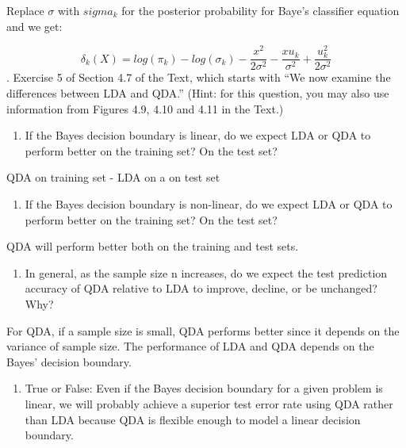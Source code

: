 \documentclass[
  11pt,
]{article}
\providecommand{\tightlist}{%
  \setlength{\itemsep}{0pt}\setlength{\parskip}{0pt}}
\begin{document}
Replace \(\sigma\) with \(sigma_k\) for the posterior probability for
Baye's classifier equation and we get:

\[\delta_k(X) = log(\pi_k) - log(\sigma_k) - \frac{x^2}{2\sigma^2} - \frac{xu_k}{\sigma^2} + \frac{u^2_k}{2\sigma^2} \]
. Exercise 5 of Section 4.7 of the Text, which starts with ``We now
examine the differences between LDA and QDA.'' (Hint: for this question,
you may also use information from Figures 4.9, 4.10 and 4.11 in the
Text.)

\begin{enumerate}
\def\labelenumi{(\alph{enumi})}
\tightlist
\item
  If the Bayes decision boundary is linear, do we expect LDA or QDA to
  perform better on the training set? On the test set?
\end{enumerate}

QDA on training set - LDA on a on test set

\begin{enumerate}
\def\labelenumi{(\alph{enumi})}
\setcounter{enumi}{1}
\tightlist
\item
  If the Bayes decision boundary is non-linear, do we expect LDA or QDA
  to perform better on the training set? On the test set?
\end{enumerate}

QDA will perform better both on the training and test sets.

\begin{enumerate}
\def\labelenumi{(\alph{enumi})}
\setcounter{enumi}{2}
\tightlist
\item
  In general, as the sample size n increases, do we expect the test
  prediction accuracy of QDA relative to LDA to improve, decline, or be
  unchanged? Why?
\end{enumerate}

For QDA, if a sample size is small, QDA performs better since it depends
on the variance of sample size. The performance of LDA and QDA depends
on the Bayes' decision boundary.

\begin{enumerate}
\def\labelenumi{(\alph{enumi})}
\setcounter{enumi}{3}
\tightlist
\item
  True or False: Even if the Bayes decision boundary for a given problem
  is linear, we will probably achieve a superior test error rate using
  QDA rather than LDA because QDA is flexible enough to model a linear
  decision boundary.
\end{enumerate}
\end{document}
